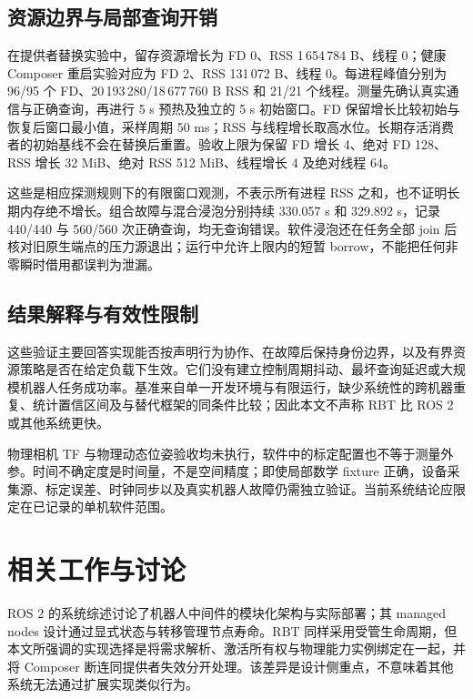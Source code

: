 \documentclass[UTF8,fontset=none,zihao=-4,a4paper]{ctexart}
\begin{document}
\subsection{资源边界与局部查询开销}
\label{sec:resources}
在提供者替换实验中，留存资源增长为 FD 0、RSS 1\,654\,784 B、线程 0；健康 Composer 重启实验对应为 FD 2、RSS 131\,072 B、线程 0。每进程峰值分别为 96/95 个 FD、20\,193\,280/18\,677\,760 B RSS 和 21/21 个线程。测量先确认真实通信与正确查询，再进行 5 s 预热及独立的 5 s 初始窗口。FD 保留增长比较初始与恢复后窗口最小值，采样周期 50 ms；RSS 与线程增长取高水位。长期存活消费者的初始基线不会在替换后重置。验收上限为保留 FD 增长 4、绝对 FD 128、RSS 增长 32 MiB、绝对 RSS 512 MiB、线程增长 4 及绝对线程 64。\par
这些是相应探测规则下的有限窗口观测，不表示所有进程 RSS 之和，也不证明长期内存绝不增长。组合故障与混合浸泡分别持续 330.057 s 和 329.892 s，记录 440/440 与 560/560 次正确查询，均无查询错误。软件浸泡还在任务全部 join 后核对旧原生端点的压力源退出；运行中允许上限内的短暂 borrow，不能把任何非零瞬时借用都误判为泄漏。



\subsection{结果解释与有效性限制}
这些验证主要回答实现能否按声明行为协作、在故障后保持身份边界，以及有界资源策略是否在给定负载下生效。它们没有建立控制周期抖动、最坏查询延迟或大规模机器人任务成功率。基准来自单一开发环境与有限运行，缺少系统性的跨机器重复、统计置信区间及与替代框架的同条件比较；因此本文不声称 RBT 比 ROS 2 或其他系统更快。

物理相机 TF 与物理动态位姿验收均未执行，软件中的标定配置也不等于测量外参。时间不确定度是时间量，不是空间精度；即使局部数学 fixture 正确，设备采集源、标定误差、时钟同步以及真实机器人故障仍需独立验证。当前系统结论应限定在已记录的单机软件范围。

\section{相关工作与讨论}
ROS 2 的系统综述讨论了机器人中间件的模块化架构与实际部署\cite{ros2}；其 managed nodes 设计通过显式状态与转移管理节点寿命\cite{roslifecycle}。RBT 同样采用受管生命周期，但本文所强调的实现选择是将需求解析、激活所有权与物理能力实例绑定在一起，并将 Composer 断连同提供者失效分开处理。该差异是设计侧重点，不意味着其他系统无法通过扩展实现类似行为。
\end{document}
